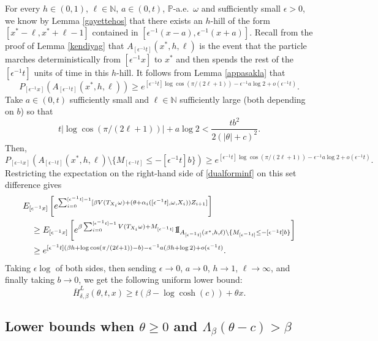 \documentclass[a4paper]{amsart}
\numberwithin{equation}{section}
\theoremstyle{plain}
\theoremstyle{remark}
\begin{document}
For every $h\in(0,1)$, $\ell\in\mathbb{N}$, $a\in(0,t)$, $\mathbb{P}$-a.e.\ $\omega$ and sufficiently small ${\epsilon}>0$, we know by Lemma \ref{gayettehos} that there exists an $h$-hill of the form $[x^* - \ell,x^* + \ell - 1]$ contained in $[{\epsilon^{-1}}(x-a),{\epsilon^{-1}}(x+a)]$. Recall from the proof of Lemma \ref{kendiyag} that $A_{[{\epsilon^{-1}} t]}(x^*,h,\ell)$
is the event that the particle marches deterministically from 
{}{$[{\epsilon^{-1}} x]$}
to $x^*$ and then spends the rest of the $[{\epsilon^{-1}} t]$ units of time in this $h$-hill. It follows from Lemma \ref{appasakla} that
$$P_{[{\epsilon^{-1}} x]}(A_{[{\epsilon^{-1}} t]}(x^*,h,\ell)) \ge e^{[{\epsilon^{-1}} t]\log\cos(\pi/(2\ell + 1)) - {\epsilon^{-1}} a\log2 + o({\epsilon^{-1}} t)}.$$
Take $a\in(0,t)$ sufficiently small and $\ell\in\mathbb{N}$ sufficiently large (both depending on $b$) so that $$t|\log\cos(\pi/(2\ell + 1))| + a\log2 < \frac{tb^2}{2(|\theta| + c)^2}.$$
Then, $$P_{[{\epsilon^{-1}} x]}(A_{[{\epsilon^{-1}} t]}(x^*,h,\ell)\setminus\{M_{[{\epsilon^{-1}} t]}\le - [{\epsilon^{-1}} t]b\}) \ge e^{[{\epsilon^{-1}} t]\log\cos(\pi/(2\ell + 1)) - {\epsilon^{-1}} a\log2 + o({\epsilon^{-1}} t)}.$$
Restricting the expectation on the right-hand side of \eqref{dualforminf} on this set difference gives
\begin{align*}
&E_{[{\epsilon^{-1}} x]}\left[e^{\sum_{i=0}^{[{\epsilon^{-1}} t]-1} [\beta V(T_{X_i}\omega) + (\theta + \alpha_i([{\epsilon^{-1}} t],\omega,X_i))Z_{i+1}]}\right]\\
&\quad\ge E_{[{\epsilon^{-1}} x]}\left[e^{\beta\sum_{i=0}^{[{\epsilon^{-1}} t]-1}V(T_{X_i}\omega) + M_{[{\epsilon^{-1}} t]}}{{{\rm 1\mkern-1.5mu}\!{\rm I}}}_{A_{[{\epsilon^{-1}} t]}(x^*,h,\ell)\setminus\{M_{[{\epsilon^{-1}} t]}\le - [{\epsilon^{-1}} t]b\}}\right]\\
&\quad\ge e^{[{\epsilon^{-1}} t]\left(\beta h + \log\cos(\pi/(2\ell + 1)) - b\right) - {\epsilon^{-1}} a(\beta h + \log2) + o({\epsilon^{-1}} t)}.
\end{align*}
Taking ${\epsilon}\log$ of both sides, then sending ${\epsilon}\to0$, $a\to0$, $h\to 1$, $\ell\to\infty$, and finally taking $b\to0$, we get the following uniform lower bound:
\begin{equation}\label{LBpart1}
\overline H_{\delta,\beta}^L(\theta,t,x) \ge t(\beta - \log\cosh(c)) + \theta x.
\end{equation}

\subsection{Lower bounds when $\theta\ge0$ and $\Lambda_\beta(\theta - c)>\beta$}\label{muspet}
\end{document}
